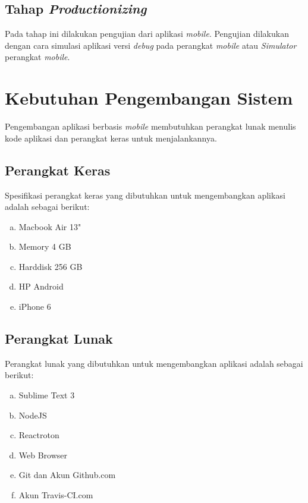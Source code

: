 \begin{spacing}{2}
  \subsection{Tahap \emph{Productionizing}}
    Pada tahap ini dilakukan pengujian dari aplikasi \emph{mobile}. Pengujian dilakukan dengan cara simulasi aplikasi versi \emph{debug} pada perangkat \emph{mobile} atau \emph{Simulator} perangkat \emph{mobile}.

\section{Kebutuhan Pengembangan Sistem}
	Pengembangan aplikasi berbasis \emph{mobile} membutuhkan perangkat lunak menulis kode aplikasi dan perangkat keras untuk menjalankannya.

	\subsection{Perangkat Keras}
		Spesifikasi perangkat keras yang dibutuhkan untuk mengembangkan aplikasi adalah sebagai berikut:

		\vspace{-0.5cm}

		\begin{enumerate}[a.]
		\itemsep0em
			\item Macbook Air 13"
			\item Memory 4 GB
			\item Harddisk 256 GB
			\item HP Android
			\item iPhone 6
		\end{enumerate}

	\subsection{Perangkat Lunak}
		Perangkat lunak yang dibutuhkan untuk mengembangkan aplikasi adalah sebagai berikut:

		\vspace{-0.5cm}

		\begin{enumerate}[a.]
		\itemsep0em
			\item Sublime Text 3
			\item NodeJS
			\item Reactroton
			\item Web Browser
			\item Git dan Akun Github.com
			\item Akun Travis-CI.com
		\end{enumerate}


\end{spacing}
